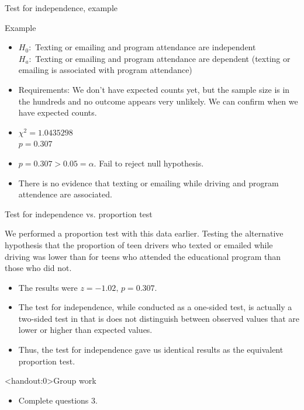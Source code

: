 \documentclass[xcolor=table, aspectratio=169, bigger]{beamer}
\begin{document}
\begin{frame}{Test for independence, example}
\begin{exampleblock}{Example}
\begin{itemize}
\pause\item $H_0:$ Texting or emailing and program attendance are independent\\
$H_a:$ Texting or emailing and program attendance are dependent (texting or emailing is associated with program attendance)
\pause\item Requirements: We don't have expected counts yet, but the sample size is in the hundreds and no outcome appears very unlikely. We can confirm when we have expected counts.
\pause\item $\chi^2 = 1.0435298$\\
$p = 0.307 $
\pause\item $p = 0.307 > 0.05 = \alpha$. Fail to reject null hypothesis.
\pause\item There is no evidence that texting or emailing while driving and program attendence are associated.
\end{itemize}
\end{exampleblock}
\end{frame}

\begin{frame}{Test for independence vs. proportion test}
\begin{block}{}
We performed a proportion test with this data earlier. Testing the alternative hypothesis that the proportion of teen drivers who texted or emailed while driving was lower than for teens who attended the educational program than those who did not. \\
\begin{itemize}
\pause\item The results were $z = -1.02, \, p = 0.307$.\\
\pause\item The test for independence, while conducted as a one-sided test, is actually a two-sided test in that is does not distinguish between observed values that are lower or higher than expected values.\\
\pause\item Thus, the test for independence gave us identical results as the equivalent proportion test.
\end{itemize}
\end{block}
\end{frame}


\begin{frame}<handout:0>{Group work}
\begin{block}{}
\large
\begin{itemize}
\item Complete questions 3.
\end{itemize}
\end{block}
\end{frame}
\end{document}
